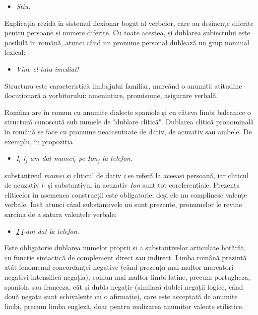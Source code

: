 \documentclass[]{../../metanetpaper}
\begin{document}
\begin{multicols}{2}
\begin{itemize}
\item \textit{Știu.}
\end{itemize}

Explicația rezidă în sistemul flexionar bogat al verbelor, care au desinențe diferite pentru persoane și numere diferite.
Cu toate acestea, și dublarea subiectului este posibilă în română, atunci când un pronume personal dublează un grup nominal lexical:

\begin{itemize}
\item\textit{Vine el tata imediat!}
\end{itemize}

Structura este caracteristică limbajului familiar, marcând o anumită atitudine ilocuționară a vorbitorului: amenințare, promisiune, asigurare verbală.

Româna are în comun cu anumite dialecte spaniole și cu câteva limbi balcanice o structură cunoscută sub numele de "dublare clitică". Dublarea clitică pronominală în română se face cu pronume neaccentuate de dativ, de acuzativ sau ambele. De exemplu, în propoziția 

\begin{itemize}
\item\textit{I$_{i}$ l$_{j}$-am dat mamei$_{i}$ pe Ion$_{j}$ la telefon.}
\end{itemize}

substantivul \textit{mamei} și cliticul de dativ \textit{i} se referă la aceeași persoană, iar cliticul de acuzativ \textit{l-} și substantivul în acuzativ \textit{Ion} sunt tot coreferențiale. Prezența cliticelor în asemenea construcții este obligatorie, deși ele nu complinesc valențe verbale. Însă atunci când substantivele nu sunt prezente, pronumelor le revine sarcina de a satura valențele verbale:

\begin{itemize}
\item\textit{\underline{I} \underline{l}-am dat la telefon.}
\end{itemize}

Este obligatorie dublarea numelor proprii și a substantivelor articulate hotărât, cu funcție sintactică de complement direct sau indirect. 
Limba română prezintă atât fenomenul concordanței negative (când prezența mai multor marcatori negativi intensifică negația), comun mai multor limbi latine, precum portugheza, spaniola sau franceza, cât și dubla negație (similară dublei negații logice, când două negații sunt echivalente cu o afirmație), care este acceptată de anumite limbi, precum limba engleză, doar pentru realizarea anumitor valențe stilistice. 


\end{multicols}
\end{document}
